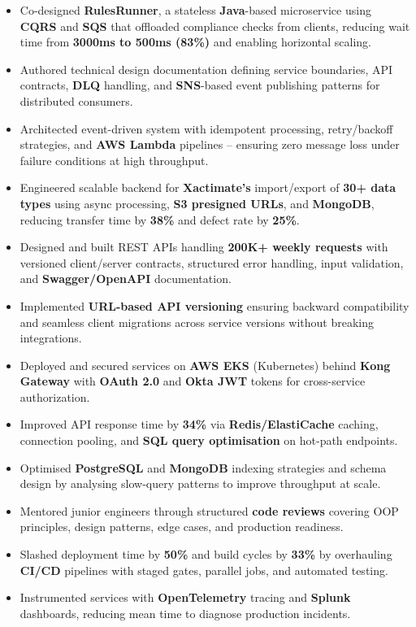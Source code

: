 \documentclass[letterpaper,10pt]{article}
\begin{document}
\begin{itemize}[leftmargin=*]
    \item Co-designed \textbf{RulesRunner}, a stateless \textbf{Java}-based microservice using \textbf{CQRS} and \textbf{SQS} that offloaded compliance checks from clients, reducing wait time from \textbf{3000ms to 500ms (83\%)} and enabling horizontal scaling.
    \item Authored technical design documentation defining service boundaries, API contracts, \textbf{DLQ} handling, and \textbf{SNS}-based event publishing patterns for distributed consumers.
    \item Architected event-driven system with idempotent processing, retry/backoff strategies, and \textbf{AWS Lambda} pipelines -- ensuring zero message loss under failure conditions at high throughput.
    \item Engineered scalable backend for \textbf{Xactimate's} import/export of \textbf{30+ data types} using async processing, \textbf{S3 presigned URLs}, and \textbf{MongoDB}, reducing transfer time by \textbf{38\%} and defect rate by \textbf{25\%}.
    \item Designed and built REST APIs handling \textbf{200K+ weekly requests} with versioned client/server contracts, structured error handling, input validation, and \textbf{Swagger/OpenAPI} documentation.
    \item Implemented \textbf{URL-based API versioning} ensuring backward compatibility and seamless client migrations across service versions without breaking integrations.
    \item Deployed and secured services on \textbf{AWS EKS} (Kubernetes) behind \textbf{Kong Gateway} with \textbf{OAuth 2.0} and \textbf{Okta JWT} tokens for cross-service authorization.
    \item Improved API response time by \textbf{34\%} via \textbf{Redis/ElastiCache} caching, connection pooling, and \textbf{SQL query optimisation} on hot-path endpoints.
    \item Optimised \textbf{PostgreSQL} and \textbf{MongoDB} indexing strategies and schema design by analysing slow-query patterns to improve throughput at scale.
    \item Mentored junior engineers through structured \textbf{code reviews} covering OOP principles, design patterns, edge cases, and production readiness.
    \item Slashed deployment time by \textbf{50\%} and build cycles by \textbf{33\%} by overhauling \textbf{CI/CD} pipelines with staged gates, parallel jobs, and automated testing.
    \item Instrumented services with \textbf{OpenTelemetry} tracing and \textbf{Splunk} dashboards, reducing mean time to diagnose production incidents.
\end{itemize}
\end{document}
